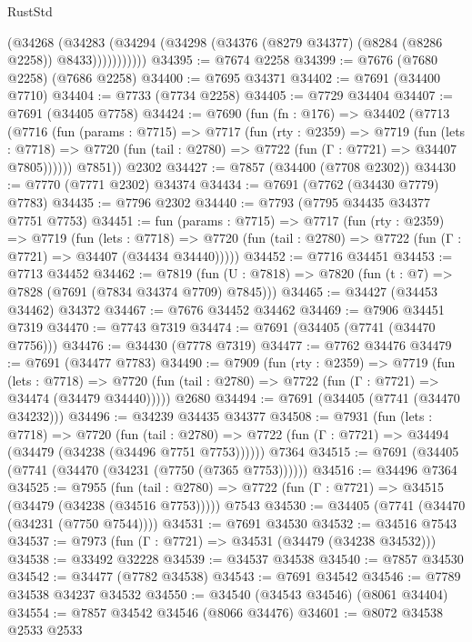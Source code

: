 \begin{lexlean}{RustStd}
\begin{coremodule}
                (@34268
                  (@34283
                    (@34294 (@34298 (@34376 (@8279 @34377) (@8284 (@8286 @2258)) @8433)))))))))))
@34395 := @7674 @2258
@34399 := @7676 (@7680 @2258) (@7686 @2258)
@34400 := @7695 @34371
@34402 := @7691 (@34400 @7710)
@34404 := @7733 (@7734 @2258)
@34405 := @7729 @34404
@34407 := @7691 (@34405 @7758)
@34424 := @7690
    (fun (fn : @176) =>
    @34402
      (@7713
        (@7716
          (fun (params : @7715) =>
          @7717
            (fun (rty : @2359) =>
            @7719
              (fun (lets : @7718) =>
              @7720 (fun (tail : @2780) => @7722 (fun (Γ : @7721) => @34407 @7805))))))
        @7851))
    @2302
@34427 := @7857 (@34400 (@7708 @2302))
@34430 := @7770 (@7771 @2302) @34374
@34434 := @7691 (@7762 (@34430 @7779) @7783)
@34435 := @7796 @2302
@34440 := @7793 (@7795 @34435 @34377 @7751 @7753)
@34451 := fun (params : @7715) =>
  @7717
    (fun (rty : @2359) =>
    @7719
      (fun (lets : @7718) =>
      @7720 (fun (tail : @2780) => @7722 (fun (Γ : @7721) => @34407 (@34434 @34440)))))
@34452 := @7716 @34451
@34453 := @7713 @34452
@34462 := @7819
    (fun (U : @7818) => @7820 (fun (t : @7) => @7828 (@7691 (@7834 @34374 @7709) @7845)))
@34465 := @34427 (@34453 @34462) @34372
@34467 := @7676 @34452 @34462
@34469 := @7906 @34451 @7319
@34470 := @7743 @7319
@34474 := @7691 (@34405 (@7741 (@34470 @7756)))
@34476 := @34430 (@7778 @7319)
@34477 := @7762 @34476
@34479 := @7691 (@34477 @7783)
@34490 := @7909
    (fun (rty : @2359) =>
    @7719
      (fun (lets : @7718) =>
      @7720 (fun (tail : @2780) => @7722 (fun (Γ : @7721) => @34474 (@34479 @34440)))))
    @2680
@34494 := @7691 (@34405 (@7741 (@34470 @34232)))
@34496 := @34239 @34435 @34377
@34508 := @7931
    (fun (lets : @7718) =>
    @7720
      (fun (tail : @2780) =>
      @7722 (fun (Γ : @7721) => @34494 (@34479 (@34238 (@34496 @7751 @7753))))))
    @7364
@34515 := @7691 (@34405 (@7741 (@34470 (@34231 (@7750 (@7365 @7753))))))
@34516 := @34496 @7364
@34525 := @7955
    (fun (tail : @2780) => @7722 (fun (Γ : @7721) => @34515 (@34479 (@34238 (@34516 @7753)))))
    @7543
@34530 := @34405 (@7741 (@34470 (@34231 (@7750 @7544))))
@34531 := @7691 @34530
@34532 := @34516 @7543
@34537 := @7973 (fun (Γ : @7721) => @34531 (@34479 (@34238 @34532)))
@34538 := @33492 @32228
@34539 := @34537 @34538
@34540 := @7857 @34530
@34542 := @34477 (@7782 @34538)
@34543 := @7691 @34542
@34546 := @7789 @34538 @34237 @34532
@34550 := @34540 (@34543 @34546) (@8061 @34404)
@34554 := @7857 @34542 @34546 (@8066 @34476)
@34601 := @8072
    @34538
    @2533
    @2533

\end{coremodule}
\end{lexlean}
